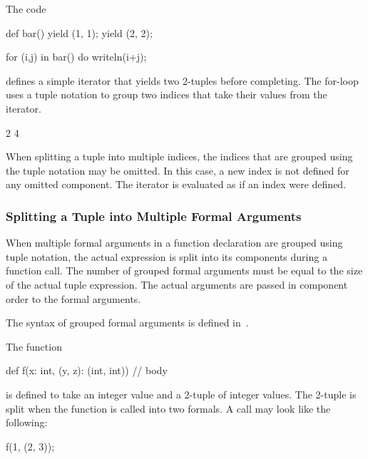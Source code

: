 \begin{example}
\begin{chapelpre}
\end{chapelpre}
The code
\begin{chapel}
def bar() {
  yield (1, 1);
  yield (2, 2);
}

for (i,j) in bar() do
  writeln(i+j);
\end{chapel}
defines a simple iterator that yields two 2-tuples before completing.
The for-loop uses a tuple notation to group two indices that take
their values from the iterator.
\begin{chapelpost}
\end{chapelpost}
\begin{chapeloutput}
2
4
\end{chapeloutput}
\end{example}

When splitting a tuple into multiple indices, the indices that are
grouped using the tuple notation may be omitted.  In this case, a new
index is not defined for any omitted component.  The iterator is
evaluated as if an index were defined.

\subsubsection{Splitting a Tuple into Multiple Formal Arguments}
\label{Formal_Argument_Declarations_in_a_Tuple}

When multiple formal arguments in a function declaration are grouped
using tuple notation, the actual expression is split into its
components during a function call.  The number of grouped formal
arguments must be equal to the size of the actual tuple expression.
The actual arguments are passed in component order to the formal
arguments.

The syntax of grouped formal arguments is defined
in~.

\begin{example}
\begin{chapelpre}
\end{chapelpre}
The function
\begin{chapel}
def f(x: int, (y, z): (int, int)) {
  // body
}
\end{chapel}
is defined to take an integer value and a 2-tuple of integer values.
The 2-tuple is split when the function is called into two formals.  A
call may look like the following:
\begin{chapel}
f(1, (2, 3));
\end{chapel}
\begin{chapelpost}
\end{chapelpost}
\begin{chapeloutput}
\end{chapeloutput}
\end{example}

